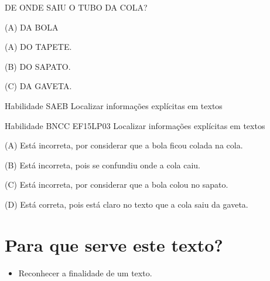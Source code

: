 {{{DE ONDE SAIU O TUBO DA COLA?

(A) DA BOLA

(A) DO TAPETE.

(B) DO SAPATO.

(C) DA GAVETA.

Habilidade SAEB Localizar informações explícitas em textos

Habilidade BNCC EF15LP03 Localizar informações explícitas em textos

(A) Está incorreta, por considerar que a bola ficou colada na cola.

(B) Está incorreta, pois se confundiu onde a cola caiu.

(C) Está incorreta, por considerar que a bola colou no sapato.

(D) Está correta, pois está claro no texto que a cola saiu da gaveta.

\chapter{Para que serve este texto?}



\begin{itemize}
\item Reconhecer a finalidade de um texto.
\end{itemize}

}}}
